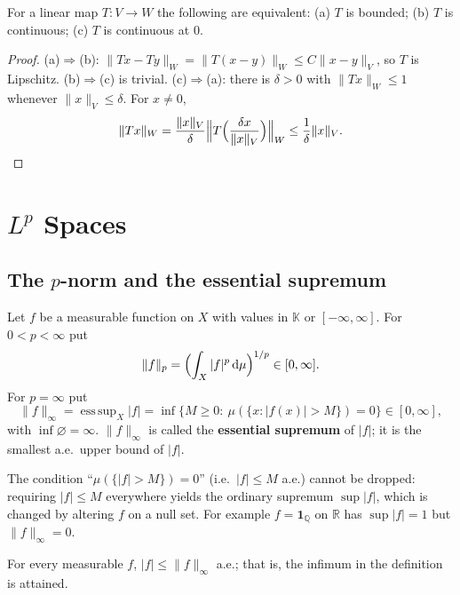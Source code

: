 \documentclass[11pt]{article}
\newcommand{\K}{\mathbb{K}}
\newcommand{\R}{\mathbb{R}}
\newcommand{\Q}{\mathbb{Q}}
\newcommand{\norm}[1]{\lVert #1\rVert}
\newcommand{\dmu}{\,\mathrm{d}\mu}
\newcommand{\ind}{\mathbf{1}}
\DeclareMathOperator*{\esssup}{ess\,sup}
\begin{document}
\begin{proposition}\label{prop:bounded-cont}
For a linear map $T:V\to W$ the following are equivalent: (a) $T$ is bounded; (b) $T$ is continuous; (c) $T$ is continuous at $0$.
\end{proposition}

\begin{proof}
(a)$\Rightarrow$(b): $\norm{Tx-Ty}_{W}=\norm{T(x-y)}_{W}\le C\norm{x-y}_{V}$, so $T$ is Lipschitz. (b)$\Rightarrow$(c) is trivial. (c)$\Rightarrow$(a): there is $\delta>0$ with $\norm{Tx}_{W}\le1$ whenever $\norm{x}_{V}\le\delta$. For $x\ne0$,
\[
\norm{Tx}_{W}=\frac{\norm{x}_{V}}{\delta}\Bigl\|T\Bigl(\frac{\delta x}{\norm{x}_{V}}\Bigr)\Bigr\|_{W}\le\frac{1}{\delta}\norm{x}_{V}. \qedhere
\]
\end{proof}

\section{$L^{p}$ Spaces}

\subsection{The $p$-norm and the essential supremum}

\begin{definition}\label{def:pnorm}
Let $f$ be a measurable function on $X$ with values in $\K$ or $[-\infty,\infty]$. For $0<p<\infty$ put
\[
\norm{f}_{p}=\Bigl(\int_{X}|f|^{p}\dmu\Bigr)^{1/p}\in[0,\infty].
\]
For $p=\infty$ put
\[
\norm{f}_{\infty}=\esssup_{X}|f|=\inf\bigl\{M\ge0:\ \mu(\{x:|f(x)|>M\})=0\bigr\}\in[0,\infty],
\]
with $\inf\varnothing=\infty$. $\norm{f}_{\infty}$ is called the \textbf{essential supremum} of $|f|$; it is the smallest a.e.\ upper bound of $|f|$.
\end{definition}

\begin{remark}
The condition ``$\mu(\{|f|>M\})=0$'' (i.e.\ $|f|\le M$ a.e.) cannot be dropped: requiring $|f|\le M$ everywhere yields the ordinary supremum $\sup|f|$, which is changed by altering $f$ on a null set. For example $f=\ind_{\Q}$ on $\R$ has $\sup|f|=1$ but $\norm{f}_{\infty}=0$.
\end{remark}

\begin{lemma}\label{lem:esssup}
For every measurable $f$, $|f|\le\norm{f}_{\infty}$ a.e.; that is, the infimum in the definition is attained.
\end{lemma}
\end{document}
